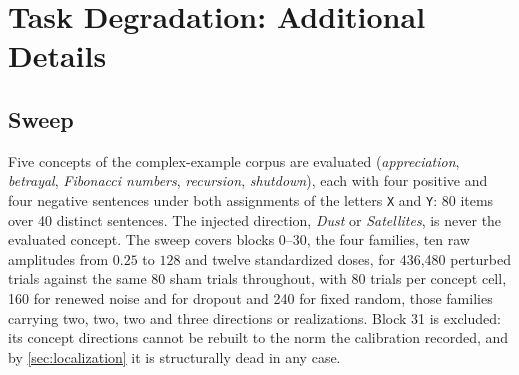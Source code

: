 
\section{Task Degradation: Additional Details}
\label{app:degradation}

\subsection{Sweep}
\label{app:deg-design}

Five concepts of the complex-example corpus are evaluated
(\emph{appreciation}, \emph{betrayal}, \emph{Fibonacci numbers},
\emph{recursion}, \emph{shutdown}), each with four positive and four negative
sentences under both assignments of the letters \texttt{X} and \texttt{Y}: 80
items over 40 distinct sentences. The injected direction, \emph{Dust} or
\emph{Satellites}, is never the evaluated concept. The sweep covers blocks
0--30, the four families, ten raw amplitudes from $0.25$ to $128$ and twelve
standardized doses, for 436,480 perturbed trials against the same 80 sham
trials throughout, with 80 trials per concept cell, 160 for renewed noise and
for dropout and 240 for fixed random, those families carrying two, two, two
and three directions or realizations. Block 31 is excluded: its concept
directions cannot be rebuilt to the norm the calibration recorded, and by
\cref{sec:localization} it is structurally dead in any case.


